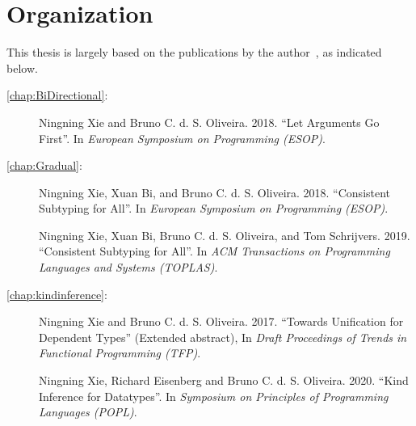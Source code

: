 \section{Organization}

This thesis is largely based on the
publications by the author~\citep{esop2018:arguments,esop2018:consistent,toplas:consistent,popl:kind,tfp},
as indicated below.
\begin{description}
\item[\cref{chap:BiDirectional}:] Ningning Xie and Bruno C. d. S.
  Oliveira. 2018. ``Let Arguments Go First''. In
  \emph{European Symposium on Programming (ESOP)}.
\item[\cref{chap:Gradual}:] Ningning Xie, Xuan Bi, and Bruno C. d. S.
  Oliveira. 2018. ``Consistent Subtyping for All''. In
  \emph{European Symposium on Programming (ESOP)}.
\item[\quad\quad] Ningning Xie, Xuan Bi, Bruno C. d. S.
  Oliveira, and Tom Schrijvers. 2019. ``Consistent Subtyping for All''. In
  \emph{ACM Transactions on Programming Languages and Systems (TOPLAS)}.
\item[\cref{chap:kindinference}:]
  Ningning Xie and Bruno C. d. S. Oliveira.
  2017. ``Towards Unification for Dependent Types'' (Extended abstract), In \emph{Draft Proceedings
    of Trends in Functional Programming (TFP)}.
\item[\quad\quad]
  Ningning Xie, Richard Eisenberg and Bruno C. d. S. Oliveira. 2020. ``Kind
  Inference for Datatypes''. In \emph{Symposium on Principles of Programming
    Languages (POPL)}.
\end{description}


\noindent\makebox[\linewidth]{\rule{0.7\textwidth}{0.4pt}}

\vspace{1.5\baselineskip}



